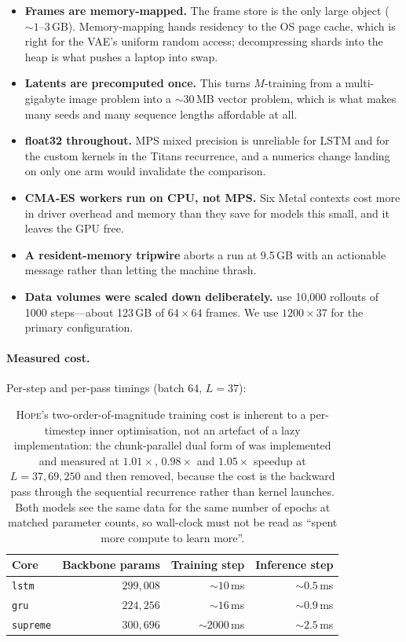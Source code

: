 \documentclass[11pt,a4paper]{article}
\newcommand{\code}[1]{\texttt{\small #1}}
\begin{document}
\begin{itemize}[leftmargin=*]
\item \textbf{Frames are memory-mapped.} The frame store is the only large object
(${\sim}1$--$3$\,GB). Memory-mapping hands residency to the OS page cache, which
is right for the VAE's uniform random access; decompressing shards into the heap
is what pushes a laptop into swap.
\item \textbf{Latents are precomputed once.} This turns $M$-training from a
multi-gigabyte image problem into a ${\sim}30$\,MB vector problem, which is what
makes many seeds and many sequence lengths affordable at all.
\item \textbf{float32 throughout.} MPS mixed precision is unreliable for LSTM and
for the custom kernels in the Titans recurrence, and a numerics change landing on
only one arm would invalidate the comparison.
\item \textbf{CMA-ES workers run on CPU, not MPS.} Six Metal contexts cost more
in driver overhead and memory than they save for models this small, and it leaves
the GPU free.
\item \textbf{A resident-memory tripwire} aborts a run at 9.5\,GB with an
actionable message rather than letting the machine thrash.
\item \textbf{Data volumes were scaled down deliberately.} \cite{ha2018world} use
10{,}000 rollouts of 1000 steps---about 123\,GB of $64\times64$ frames. We use
$1200\times37$ for the primary configuration.
\end{itemize}

\paragraph{Measured cost.} Per-step and per-pass timings (batch 64, $L=37$):

\begin{table}[h]
\centering
\begin{tabular}{lrrr}
\toprule
Core & Backbone params & Training step & Inference step \\
\midrule
\code{lstm}    & $299{,}008$ & ${\sim}10$\,ms   & ${\sim}0.5$\,ms \\
\code{gru}     & $224{,}256$ & ${\sim}16$\,ms   & ${\sim}0.9$\,ms \\
\code{supreme} & $300{,}696$ & ${\sim}2000$\,ms & ${\sim}2.5$\,ms \\
\bottomrule
\end{tabular}
\caption{\textsc{Hope}'s two-order-of-magnitude training cost is inherent to a
per-timestep inner optimisation, not an artefact of a lazy implementation: the
chunk-parallel dual form of \cite[\S8.2]{behrouz2025nested} was implemented and
measured at $1.01\times$, $0.98\times$ and $1.05\times$ speedup at $L=37,69,250$
and then removed, because the cost is the backward pass through the sequential
recurrence rather than kernel launches. Both models see the same data for the
same number of epochs at matched parameter counts, so wall-clock must not be read
as ``spent more compute to learn more''.}
\end{table}
\end{document}
